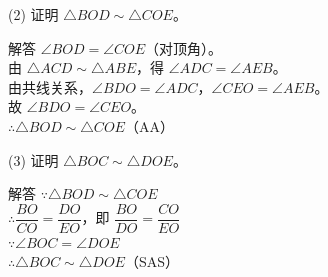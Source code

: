 \documentclass{exam-zh}
\begin{document}
\begin{eduSubQuestionItem}{(2)}
证明 $\triangle BOD\sim\triangle COE$。\end{eduSubQuestionItem}

\begin{eduSolutionBox}{解答}
$\angle BOD=\angle COE$（对顶角）。\\
由 $\triangle ACD\sim\triangle ABE$，得 $\angle ADC=\angle AEB$。\\
由共线关系，$\angle BDO=\angle ADC$，$\angle CEO=\angle AEB$。\\
故 $\angle BDO=\angle CEO$。\\
$\therefore \triangle BOD\sim\triangle COE$（AA）
\end{eduSolutionBox}




\begin{eduSubQuestionItem}{(3)}
证明 $\triangle BOC\sim\triangle DOE$。\end{eduSubQuestionItem}

\begin{eduSolutionBox}{解答}
$\because \triangle BOD\sim\triangle COE$\\
$\therefore \dfrac{BO}{CO}=\dfrac{DO}{EO}$，即 $\dfrac{BO}{DO}=\dfrac{CO}{EO}$\\
$\because \angle BOC=\angle DOE$\\
$\therefore \triangle BOC\sim\triangle DOE$（SAS）
\end{eduSolutionBox}
\end{document}
